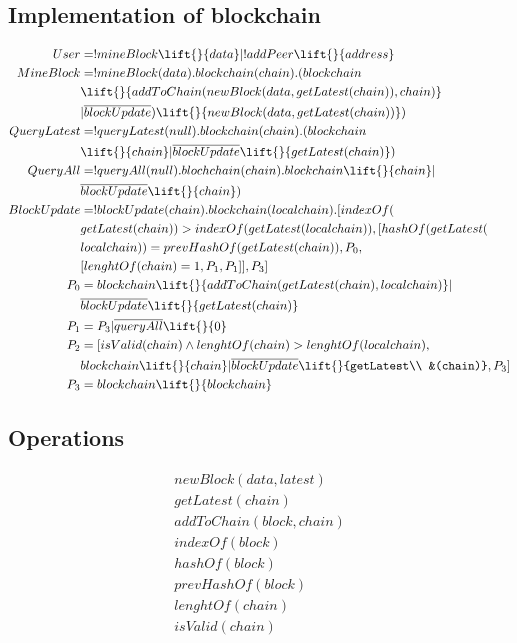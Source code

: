 \subsection{Implementation of blockchain}

\begin{align*}
    User &= !mineBlock \lift{}{data} |!addPeer\lift{}{address}\\
    MineBlock &= !mineBlock(data).blockchain(chain).(blockchain\\
        &\lift{}{addToChain(newBlock(data,getLatest(chain)),chain)}\\
        &|\overline{blockUpdate})\lift{}{newBlock(data, getLatest(chain))})\\
    QueryLatest &=!queryLatest(null).blockchain(chain).(blockchain\\
        &\lift{}{chain}|\overline{blockUpdate}\lift{}{getLatest(chain)})\\
        QueryAll &= !queryAll(null).blochchain(chain).blockchain\lift{}{chain}|\\
        &\overline{blockUpdate}\lift{}{chain})\\
    BlockUpdate &= !blockUpdate(chain).blockchain(localchain).[indexOf(\\
        &getLatest(chain))>indexOf(getLatest(localchain)),[hashOf(getLatest(\\
        &localchain))=prevHashOf(getLatest(chain)),P_0,\\
        &[lenghtOf(chain)=1,P_1,P_1]],P_3]\\
    P_0 &= blockchain\lift{}{addToChain(getLatest(chain),localchain)}|\\
        &\overline{blockUpdate}\lift{}{getLatest(chain)}\\
    P_1 &= P_3|\overline{queryAll}\lift{}{0}\\
    P_2 &= [isValid(chain) \land lenghtOf(chain) > lenghtOf(localchain),\\
        &blockchain\lift{}{chain}|\overline{blockUpdate}\lift{}{getLatest\\
        &(chain)},P_3]\\
    P_3 &= blockchain\lift{}{blockchain}
\end{align*}

\subsection{Operations}

\begin{align*}
    newBlock(data,latest)\\
    getLatest(chain)\\
    addToChain(block,chain)\\
    indexOf(block)\\
    hashOf(block)\\
    prevHashOf(block)\\
    lenghtOf(chain)\\
    isValid(chain)\\
\end{align*}

